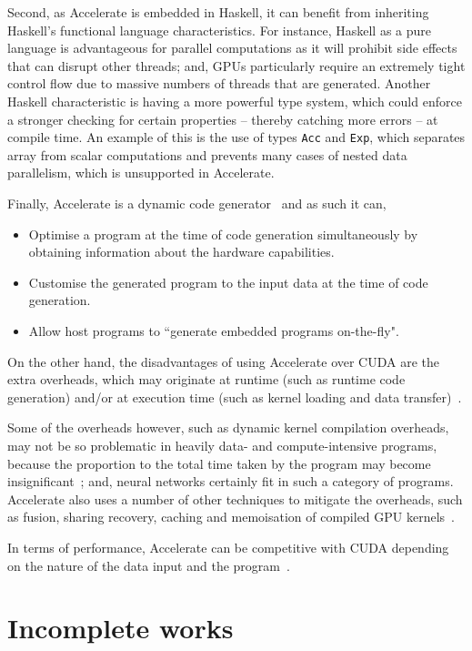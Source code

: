 Second, as Accelerate is embedded in Haskell, it can benefit from inheriting Haskell's functional language characteristics. For instance, Haskell as a pure language is advantageous for parallel computations as it will prohibit side effects that can disrupt other threads; and, GPUs particularly require an extremely tight control flow due to massive numbers of threads that are generated. Another Haskell characteristic is having a more powerful type system, which could enforce a stronger checking for certain properties -- thereby catching more errors -- at compile time. An example of this is the use of types \texttt{Acc} and \texttt{Exp}, which separates array from scalar computations and prevents many cases of nested data parallelism, which is unsupported in Accelerate.

Finally, Accelerate is a dynamic code generator~\cite{ChaKelLee11} and as such it can,
\begin{itemize}
\item Optimise a program at the time of code generation simultaneously by obtaining information about the hardware capabilities.
\item Customise the generated program to the input data at the time of code generation.
\item Allow host programs to ``generate embedded programs on-the-fly".
\end{itemize}

On the other hand, the disadvantages of using Accelerate over CUDA are the extra overheads, which may originate at runtime (such as runtime code generation) and/or at execution time (such as kernel loading and data transfer)~\cite{ChaKelLee11}. 

Some of the overheads however, such as dynamic kernel compilation overheads, may not be so problematic in heavily data- and compute-intensive programs, because the proportion to the total time taken by the program may become insignificant~\cite{ChaKelLee11}; and, neural networks certainly fit in such a category of programs. Accelerate also uses a number of other techniques to mitigate the overheads, such as fusion, sharing recovery, caching and memoisation of compiled GPU kernels~\cite{ChaKelLee11}.

In terms of performance, Accelerate can be competitive with CUDA depending on the nature of the data input and the program~\cite{McDChaKel13}. 





\section{Incomplete works} \label{se:eval.incomplete}

